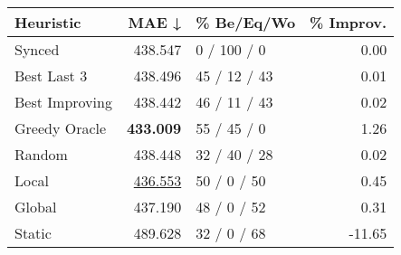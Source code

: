 \begin{tabular}{lrlr}
\toprule
\textbf{Heuristic} & \textbf{MAE ↓} & \textbf{\% Be/Eq/Wo} & \textbf{\% Improv.} \\
\midrule
            Synced &        438.547 &          0 / 100 / 0 &                0.00 \\
\midrule
       Best Last 3 &        438.496 &         45 / 12 / 43 &                0.01 \\
    Best Improving &        438.442 &         46 / 11 / 43 &                0.02 \\
\addlinespace
     Greedy Oracle &        \textbf{433.009} &          55 / 45 / 0 &                1.26 \\
            Random &        438.448 &         32 / 40 / 28 &                0.02 \\
\midrule
             Local &        \underline{436.553} &          50 / 0 / 50 &                0.45 \\
            Global &        437.190 &          48 / 0 / 52 &                0.31 \\
\midrule
            Static &        489.628 &          32 / 0 / 68 &              -11.65 \\
\bottomrule
\end{tabular}

\label{tab:iid_lr05_le1_bs2_Summary}
